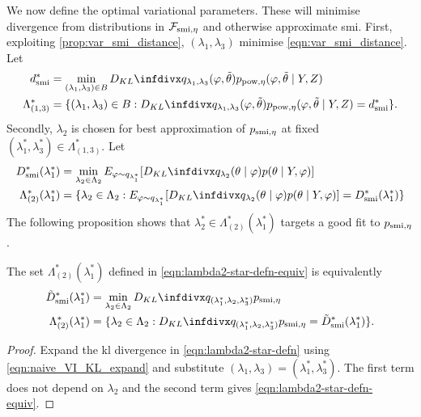 We now define the optimal variational parameters.
These will minimise divergence from distributions in $\mathcal{F}_{\operatorname{\text{smi}},\eta}$ and otherwise approximate \acrshort*{smi}.
First, exploiting \cref{prop:var_smi_distance}, $(\lambda_1,\lambda_3)$ minimise \cref{eqn:var_smi_distance}. Let
\begin{align}
  d^*_{\smi}        & =\min_{(\lambda_1,\lambda_3)\in B}\kl{q_{\lambda_1, \lambda_3}(\varphi, \tilde\theta)}{p_{\pow, \eta}(\varphi,\tilde\theta \mid Y,Z)}\nonumber \\
  \Lambda^*_{(1,3)} & = \{(\lambda_1,\lambda_3)\in B:
  \kl{q_{\lambda_1, \lambda_3}(\varphi, \tilde\theta)}{p_{\pow, \eta}(\varphi,\tilde\theta \mid Y,Z)}=d^*_{\smi}\}.
  \label{eqn:lambda13-star-defn}\end{align}
Secondly, $\lambda_2$ is chosen for best approximation of $p_{ \operatorname{\text{smi}}, \eta}$ at fixed $(\lambda^*_1,\lambda^*_3)\in \Lambda^*_{(1,3)}$. Let
\begin{align}
  D^*_{\smi}(\lambda^*_1)      & =\min_{\lambda_2\in \Lambda_2} E_{\varphi\sim q_{\lambda^*_1}}[\kl{q_{\lambda_2}(\theta\mid \varphi)}{p(\theta \mid Y,\varphi)}]\nonumber                                                    \\
  \Lambda^*_{(2)}(\lambda^*_1) & =\{\lambda_2\in \Lambda_2: E_{\varphi\sim q_{\lambda^*_1}}[\kl{q_{\lambda_2}(\theta\mid \varphi)}{p(\theta \mid Y,\varphi)}]  = D^*_{\smi}(\lambda^*_1)\}\label{eqn:lambda2-star-defn-equiv}
\end{align}
The following proposition shows that $\lambda^*_2\in \Lambda^*_{(2)}(\lambda^*_1)$ targets a good fit to $p_{ \operatorname{\text{smi}}, \eta}$.
\begin{proposition}\label{prop:var_smi_lambda2}
  The set $\Lambda^*_{(2)}(\lambda^*_1)$ defined in \cref{eqn:lambda2-star-defn-equiv} is equivalently
  \begin{align}
    \tilde D^*_{\smi}(\lambda^*_1) & =\min_{\lambda_2\in \Lambda_2} \kl{q_{(\lambda^*_1,\lambda_2,\lambda^*_3)}}{p_{ \smi, \eta}}\nonumber                                                       \\
    \Lambda^*_{(2)}(\lambda^*_1)   & =\{\lambda_2\in \Lambda_2:  \kl{q_{(\lambda^*_1,\lambda_2,\lambda^*_3)}}{p_{ \smi, \eta}} = \tilde D^*_{\smi}(\lambda^*_1)\}. \label{eqn:lambda2-star-defn}
  \end{align}
\end{proposition}
\begin{proof}
  Expand the \acrshort*{kl} divergence in \cref{eqn:lambda2-star-defn} using \cref{eqn:naive_VI_KL_expand} and substitute
  $(\lambda_1,\lambda_3)=(\lambda^*_1,\lambda^*_3)$.
  The first term does not depend on $\lambda_2$ and the second term gives \cref{eqn:lambda2-star-defn-equiv}.
\end{proof}


